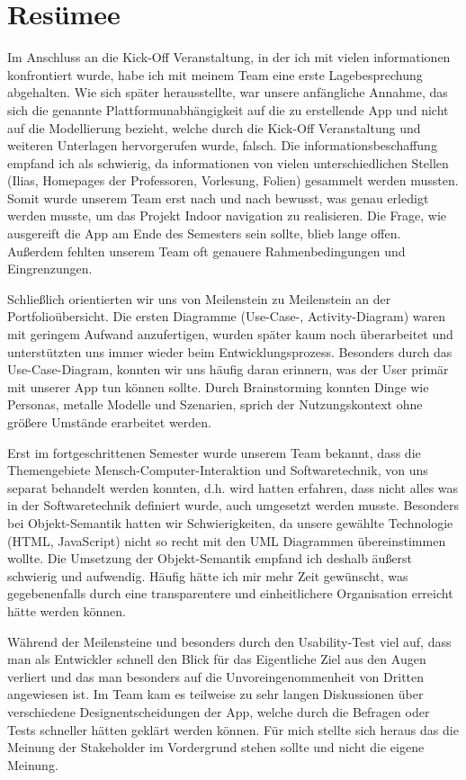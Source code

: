 \chapter{Resümee}

Im Anschluss an die Kick-Off Veranstaltung, in der ich mit vielen \gls{information}en konfrontiert wurde, habe ich mit meinem Team eine erste Lagebesprechung abgehalten. Wie sich später herausstellte, war unsere anfängliche Annahme, das sich die genannte Plattformunabhängigkeit auf die zu erstellende App und nicht auf die Modellierung bezieht, welche durch die Kick-Off Veranstaltung und weiteren Unterlagen hervorgerufen wurde, falsch. Die \gls{information}sbeschaffung empfand ich als schwierig, da \gls{information}en von vielen unterschiedlichen Stellen (Ilias, Homepages der Professoren, Vorlesung, Folien) gesammelt werden mussten. Somit wurde unserem Team erst nach und nach bewusst, was genau erledigt werden musste, um das Projekt Indoor \gls{navigation} zu realisieren. Die Frage, wie ausgereift die App am Ende des Semesters sein sollte, blieb lange offen. Außerdem fehlten unserem Team oft genauere Rahmenbedingungen und Eingrenzungen.

Schließlich orientierten wir uns von Meilenstein zu Meilenstein an der Portfolioübersicht. Die ersten Diagramme (Use-Case-, Activity-Diagram) waren mit geringem Aufwand anzufertigen, wurden später kaum noch überarbeitet und unterstützten uns immer wieder beim Entwicklungsprozess. Besonders durch das Use-Case-Diagram, konnten wir uns häufig daran erinnern, was der User primär mit unserer App tun können sollte. Durch Brainstorming konnten Dinge wie Personas, metalle Modelle und Szenarien, sprich der Nutzungskontext ohne größere Umstände erarbeitet werden.

Erst im fortgeschrittenen Semester wurde unserem Team bekannt, dass die Themengebiete Mensch-Computer-Interaktion und Softwaretechnik, von uns separat behandelt werden konnten, d.h. wird hatten erfahren, dass nicht alles was in der Softwaretechnik definiert wurde, auch umgesetzt werden musste. Besonders bei Objekt-Semantik hatten wir Schwierigkeiten, da unsere gewählte Technologie (HTML, JavaScript) nicht so recht mit den UML Diagrammen übereinstimmen wollte. Die Umsetzung der Objekt-Semantik empfand ich deshalb äußerst schwierig und aufwendig. Häufig hätte ich mir mehr Zeit gewünscht, was gegebenenfalls durch eine transparentere und einheitlichere Organisation erreicht  hätte werden können.

Während der Meilensteine und besonders durch den Usability-Test viel auf, dass man als Entwickler schnell den Blick für das Eigentliche Ziel aus den Augen verliert und das man besonders auf die Unvoreingenommenheit von Dritten angewiesen ist. Im Team kam es teilweise zu sehr langen Diskussionen über verschiedene Designentscheidungen der App, welche durch die Befragen oder Tests schneller hätten geklärt werden können. Für mich stellte sich heraus das die Meinung der Stakeholder im Vordergrund stehen sollte und nicht die eigene Meinung.
